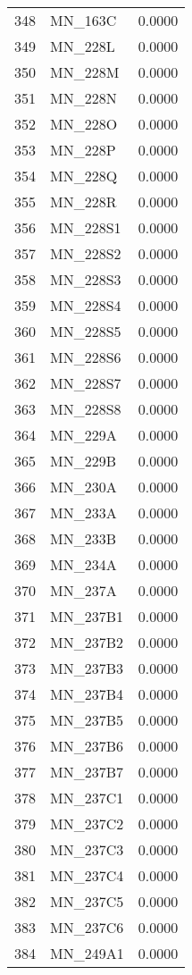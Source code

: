 \documentclass{amsart}
\begin{document}
\begin{longtable}{rlr}
  348 & MN\_163C & 0.0000 \\ 
  349 & MN\_228L & 0.0000 \\ 
  350 & MN\_228M & 0.0000 \\ 
  351 & MN\_228N & 0.0000 \\ 
  352 & MN\_228O & 0.0000 \\ 
  353 & MN\_228P & 0.0000 \\ 
  354 & MN\_228Q & 0.0000 \\ 
  355 & MN\_228R & 0.0000 \\ 
  356 & MN\_228S1 & 0.0000 \\ 
  357 & MN\_228S2 & 0.0000 \\ 
  358 & MN\_228S3 & 0.0000 \\ 
  359 & MN\_228S4 & 0.0000 \\ 
  360 & MN\_228S5 & 0.0000 \\ 
  361 & MN\_228S6 & 0.0000 \\ 
  362 & MN\_228S7 & 0.0000 \\ 
  363 & MN\_228S8 & 0.0000 \\ 
  364 & MN\_229A & 0.0000 \\ 
  365 & MN\_229B & 0.0000 \\ 
  366 & MN\_230A & 0.0000 \\ 
  367 & MN\_233A & 0.0000 \\ 
  368 & MN\_233B & 0.0000 \\ 
  369 & MN\_234A & 0.0000 \\ 
  370 & MN\_237A & 0.0000 \\ 
  371 & MN\_237B1 & 0.0000 \\ 
  372 & MN\_237B2 & 0.0000 \\ 
  373 & MN\_237B3 & 0.0000 \\ 
  374 & MN\_237B4 & 0.0000 \\ 
  375 & MN\_237B5 & 0.0000 \\ 
  376 & MN\_237B6 & 0.0000 \\ 
  377 & MN\_237B7 & 0.0000 \\ 
  378 & MN\_237C1 & 0.0000 \\ 
  379 & MN\_237C2 & 0.0000 \\ 
  380 & MN\_237C3 & 0.0000 \\ 
  381 & MN\_237C4 & 0.0000 \\ 
  382 & MN\_237C5 & 0.0000 \\ 
  383 & MN\_237C6 & 0.0000 \\ 
  384 & MN\_249A1 & 0.0000 \\ 

\end{longtable}
\end{document}
